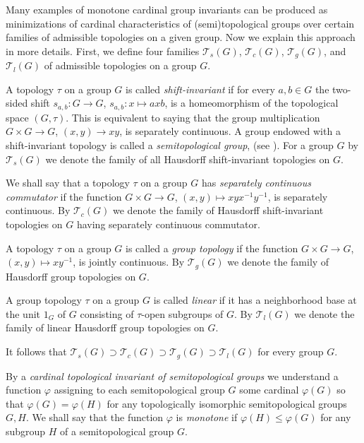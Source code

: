 \documentclass[11pt, twoside]{amsart}
\theoremstyle{definition}
\begin{document}
Many examples of monotone cardinal group invariants can be produced as minimizations of cardinal characteristics of (semi)topological groups over certain families of admissible topologies on a given group. Now we explain this approach in more details. First, we define four families ${\mathcal T}_s(G)$, ${\mathcal T}_c(G)$, ${\mathcal T}_g(G)$, and ${\mathcal T}_l(G)$ of admissible topologies on a group $G$.

A topology $\tau$ on a group $G$ is called {\em shift-invariant} if for every $a,b\in G$ the two-sided shift $s_{a,b}:G\to G$, $s_{a,b}:x\mapsto axb$, is a homeomorphism of the topological space $(G,\tau)$.
This is equivalent to saying that the group multiplication $G\times G\to G$, $(x,y)\to xy$, is separately continuous. A group endowed with a shift-invariant topology is called a {\em semitopological group}, (see \cite{AT}). For a group $G$ by ${\mathcal T}_s(G)$ we  denote the family of all Hausdorff shift-invariant topologies on $G$.

We shall say that a topology $\tau$ on a group $G$ has {\em separately continuous commutator} if the function $G\times G\to G$, $(x,y)\mapsto xyx^{-1}y^{-1}$, is separately continuous. By ${\mathcal T}_c(G)$ we denote the family of Hausdorff shift-invariant topologies on $G$ having separately continuous commutator.

A topology $\tau$ on a group $G$ is called a {\em group topology} if the function $G\times G\to G$, $(x,y)\mapsto xy^{-1}$, is jointly continuous. By ${\mathcal T}_g(G)$ we denote the family of Hausdorff group topologies on $G$.

A group topology $\tau$ on a group $G$ is called {\em linear} if it has a neighborhood base at the unit $1_G$ of $G$ consisting of $\tau$-open subgroups of $G$. By ${\mathcal T}_l(G)$ we denote the  family of linear Hausdorff group topologies on $G$.

It follows that ${\mathcal T}_s(G)\supset{\mathcal T}_c(G)\supset{\mathcal T}_g(G)\supset{\mathcal T}_l(G)$ for every group $G$.

By a {\em cardinal topological invariant of semitopological groups} we understand a function $\varphi$ assigning to each semitopological group $G$ some cardinal $\varphi(G)$ so that $\varphi(G)=\varphi(H)$ for any topologically isomorphic semitopological groups $G,H$. We shall say that the function $\varphi$ is {\em monotone} if $\varphi(H)\le\varphi(G)$ for any subgroup $H$ of a semitopological group $G$.
\end{document}
